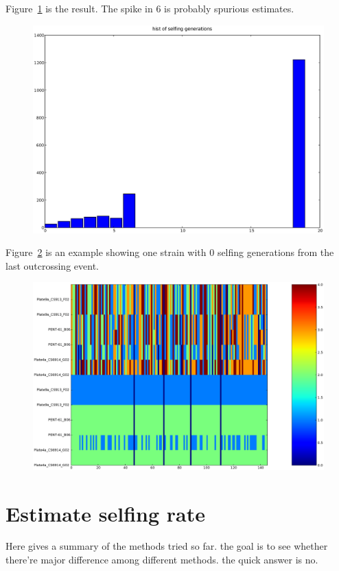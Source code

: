 \documentclass[a4paper,10pt]{article}
\begin{document}
Figure~\ref{f8} is the result. The spike in 6 is probably spurious estimates.

\begin{figure}
\includegraphics[width=1\textwidth]{figures/justin_data_y_b_filtered.estimate.selfing.generation.hist.eps}
\caption{}\label{f8}
\end{figure}

Figure~\ref{f9} is an example showing one strain with 0 selfing generations from the last outcrossing event.

\begin{figure}
\includegraphics[width=1\textwidth]{figures/trio1.eps}
\caption{}\label{f9}
\end{figure}

\section{Estimate selfing rate}
Here gives a summary of the methods tried so far. the goal is to see whether there're major difference among different methods. the quick answer is no.
\end{document}
